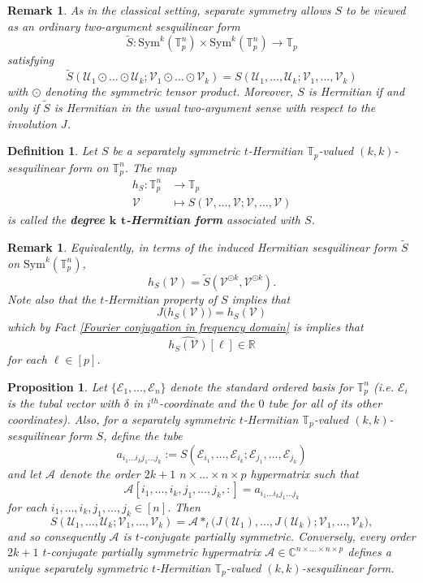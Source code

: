 \documentclass[11pt]{article}
\newtheorem{defn}[theorem]{Definition}
\newtheorem{proposition}[theorem]{Proposition}
\newtheorem{remark}[theorem]{Remark}
\begin{document}
\begin{remark}
    As in the classical setting, separate symmetry allows $S$ to be viewed as an ordinary two-argument sesquilinear form 
    \[\widetilde{S}:\mathrm{Sym}^k(\mathbb{T}_p^n)\times \mathrm{Sym}^k(\mathbb{T}_p^n)\rightarrow \mathbb{T}_p\]
    satisfying 
    \[\widetilde{S}(\mathcal{U}_1\odot\dots\odot \mathcal{U}_k; \mathcal{V}_1\odot\dots\odot \mathcal{V}_k) = S(\mathcal{U}_1,\dots,\mathcal{U}_k; \mathcal{V}_1,\dots,\mathcal{V}_k)\]
    with $\odot$ denoting the symmetric tensor product. Moreover, $S$ is Hermitian if and only if $\widetilde{S}$ is Hermitian in the usual two-argument sense with respect to the involution $J$. 
\end{remark}
\begin{defn}
    Let $S$ be a separately symmetric $t$-Hermitian $\mathbb{T}_p$-valued $(k,k)$-sesquilinear form on $\mathbb{T}_p^n$. The map 
    \begin{align*}
        h_S:\mathbb{T}_p^n&\longrightarrow \mathbb{T}_p \\
        \mathcal{V}&\mapsto S(\mathcal{V},\dots,\mathcal{V};\mathcal{V},\dots,\mathcal{V})
    \end{align*}
    is called the \textbf{degree $\boldsymbol{k}$ $\boldsymbol{t}$-Hermitian form} associated with $S$. 
\end{defn}
\begin{remark}
    Equivalently, in terms of the induced Hermitian sesquilinear form $\widetilde{S}$ on $\mathrm{Sym}^k(\mathbb{T}_p^n)$, 
    \[h_S(\mathcal{V}) = \widetilde{S}(\mathcal{V}^{\odot k},\mathcal{V}^{\odot k}).\]
    Note also that the $t$-Hermitian property of $S$ implies that 
    \[J\big(h_S(\mathcal{V})\big) = h_S(\mathcal{V})\]
    which by Fact \ref{Fourier conjugation in frequency domain} is implies that  
    \[\widehat{h_S(\mathcal{V})}[\ell]\in \mathbb{R}\]
    for each $\ell\in [p]$. 
\end{remark}
\begin{proposition}
    Let $\{\mathcal{E}_1,\dots,\mathcal{E}_n\}$ denote the standard ordered basis for $\mathbb{T}_p^n$ (i.e. $\mathcal{E}_i$ is the tubal vector with $\delta$ in $i^{th}$-coordinate and the $0$ tube for all of its other coordinates). Also, for a separately symmetric $t$-Hermitian $\mathbb{T}_p$-valued $(k,k)$-sesquilinear form $S$, define the tube 
    \[a_{i_1\dots i_k j_1\dots j_k} := S(\mathcal{E}_{i_1},\dots,\mathcal{E}_{i_k};\mathcal{E}_{j_1},\dots,\mathcal{E}_{j_k})\]
    and let $\mathcal{A}$ denote the order $2k+1$ $n\times\dots\times n\times p$ hypermatrix such that 
    \[\mathcal{A}[i_1,\dots,i_k,j_1,\dots,j_k,:] = a_{i_1\dots i_k j_1\dots j_k}\]
    for each $i_1,\dots,i_k,j_1,\dots,j_k\in [n]$. Then 
    \[S(\mathcal{U}_1,\dots,\mathcal{U}_k;\mathcal{V}_1,\dots,\mathcal{V}_k) = \mathcal{A}*_t\big(J(\mathcal{U}_1),\dots,J(\mathcal{U}_k);\mathcal{V}_1,\dots,\mathcal{V}_k\big),\]
    and so consequently $\mathcal{A}$ is $t$-conjugate partially symmetric. Conversely, every order $2k+1$ $t$-conjugate partially symmetric hypermatrix $\mathcal{A}\in \mathbb{C}^{n\times\dots\times n\times p}$ defines a unique separately symmetric $t$-Hermitian $\mathbb{T}_p$-valued $(k,k)$-sesquilinear form. 
\end{proposition}
\end{document}
